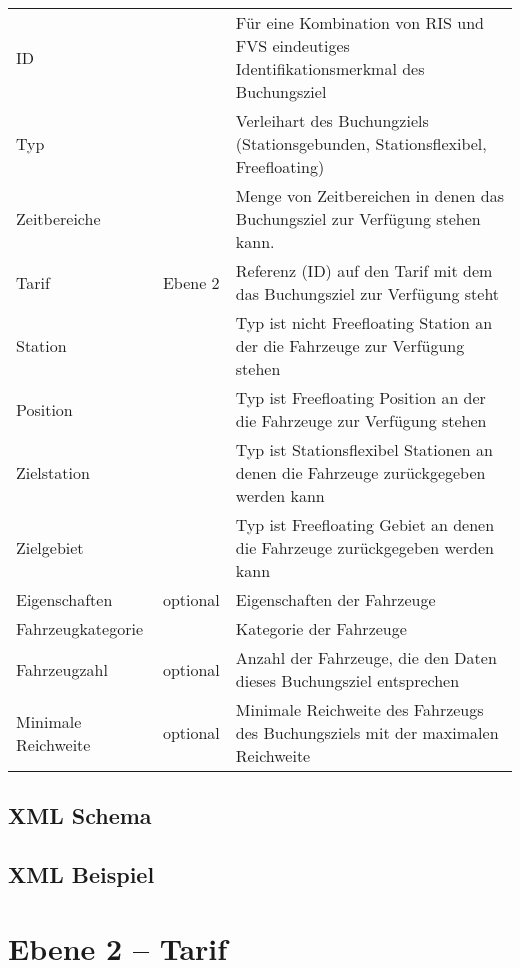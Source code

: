 \begin{flushleft}
\begin{tabularx}{\linewidth}{l>{\raggedright\arraybackslash}l>{\raggedright\arraybackslash}X} 
\toprule
ID & & Für eine Kombination von RIS und FVS eindeutiges Identifikationsmerkmal des Buchungsziel \\
Typ & & Verleihart des Buchungziels (Stationsgebunden, Stationsflexibel, Freefloating) \\
Zeitbereiche & & Menge von Zeitbereichen in denen das Buchungsziel zur Verfügung stehen kann. \\
Tarif & Ebene 2 & Referenz (ID) auf den Tarif mit dem das Buchungsziel zur Verfügung steht \\
Station & & Typ ist nicht Freefloating	Station an der die Fahrzeuge zur Verfügung stehen \\
Position & & Typ ist Freefloating	Position an der die Fahrzeuge zur Verfügung stehen \\
Zielstation & & Typ ist Stationsflexibel	Stationen an denen die Fahrzeuge zurückgegeben werden kann \\
Zielgebiet & & Typ ist Freefloating	Gebiet an denen die Fahrzeuge zurückgegeben werden kann \\
Eigenschaften & optional & Eigenschaften der Fahrzeuge \\
Fahrzeugkategorie	 & & Kategorie der Fahrzeuge \\
Fahrzeugzahl & optional & Anzahl der Fahrzeuge, die den Daten dieses Buchungsziel entsprechen \\
Minimale Reichweite & optional & Minimale Reichweite des Fahrzeugs des Buchungsziels mit der maximalen Reichweite \\
\bottomrule
\end{tabularx}
\end{flushleft}

\subsection{XML Schema}


\subsection{XML Beispiel}

\section{Ebene 2 -- Tarif}

